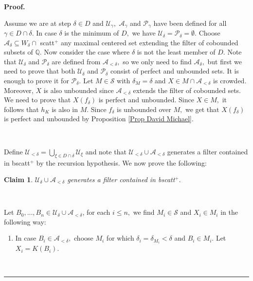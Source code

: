 \documentclass{article}%
\newtheorem{claim}[theorem]{Claim}
\newenvironment{proof}[1][Proof]{\noindent\textbf{#1.} }{\ \rule{0.5em}{0.5em}}
\begin{document}
\begin{proof}
\ \ \qquad\ \qquad\qquad\qquad\ \ \ \ \qquad\qquad\ \ \ 

Assume we are at step $\delta\in D$ and $\mathcal{U}_{\gamma},$ $\mathcal{A}%
_{\gamma}$ and $\mathcal{P}_{\gamma}$ have been defined for all $\gamma\in
D\cap\delta.$ In case $\delta$ is the minimum of $D,$ we have $\mathcal{U}%
_{\delta}=\mathcal{P}_{\delta}=\emptyset.$ Choose $\mathcal{A}_{\delta
}\subseteq W_{\delta}\cap$ \textsf{scatt}$^{+}$ any maximal centered set
extending the filter of cobounded subsets of $\mathbb{Q}.$ Now consider the
case where $\delta$ is not the least member of $D.$ Note that $\mathcal{U}%
_{\delta}$ and $\mathcal{P}_{\delta}$ are defined from $\mathcal{A}_{<\delta
},$ so we only need to find $\mathcal{A}_{\delta},$ but first we need to prove
that both $\mathcal{U}_{\delta}$ and $\mathcal{P}_{\delta}$ consist of perfect
and unbounded sets. It is enough to prove it for $\mathcal{P}_{\delta}.$ Let
$M\in\mathcal{S}$ with $\delta_{M}=\delta$ and $X\in M\cap\mathcal{A}%
_{<\delta}$ is crowded. Moreover, $X$ is also unbounded since $\mathcal{A}%
_{<\delta}$ extends the filter of cobounded sets. We need to prove that
$X\left(  f_{\delta}\right)  $ is perfect and unbounded. Since $X\in M,$ it
follows that $h_{K}$ is also in $M.$ Since $f_{\delta}$ is unbounded over $M,$
we get that $X\left(  f_{\delta}\right)  $ is perfect and unbounded by
Proposition \ref{Prop David Michael}.

\qquad\ \ \ 

Define $\mathcal{U}_{<\delta}=%
{\textstyle\bigcup\limits_{\xi\in D\cap\delta}}
\mathcal{U}_{\xi}$ and note that $\mathcal{U}_{<\delta}\cup\mathcal{A}%
_{<\delta}$ generates a filter contained in \textsf{bscatt}$^{+}$ by the
recursion hypothesis. We now prove the following:

\begin{claim}
$\mathcal{U}_{\delta}\cup\mathcal{A}_{<\delta}$ generates a filter contained
in \textsf{bscatt}$^{+}.$
\end{claim}

\qquad\ \ \ 

Let $B_{0},...,B_{n}\in\mathcal{U}_{\delta}\cup\mathcal{A}_{<\delta}$, for
each $i\leq n,$ we find $M_{i}\in\mathcal{S}$ and $X_{i}\in M_{i}$ in the
following way:

\begin{enumerate}
\item In case $B_{i}\in\mathcal{A}_{<\delta},$ choose $M_{i}$ for which
$\delta_{i}=\delta_{M_{i}}<\delta$ and $B_{i}\in M_{i}.$ Let $X_{i}=K\left(
B_{i}\right)  .$


\end{enumerate}
\end{proof}
\end{document}
